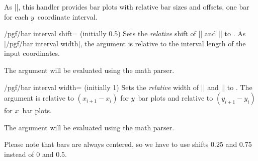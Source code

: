\begin{command}{\pgfplothandlerxbarinterval}
    As |\pgfplothandlerybarinterval|, this handler provides bar plots with
    relative bar sizes and offsets, one bar for each $y$~coordinate interval.
\end{command}

\label{key-bar-interval-shift}%
\begin{key}{/pgf/bar interval shift= (initially 0.5)}
    Sets the \emph{relative} shift of |\pgfplothandlerxbarinterval| and
    |\pgfplothandlerybarinterval| to . As
    |/pgf/bar interval width|, the argument is relative to the interval length
    of the input coordinates.

    The argument  will be evaluated using the math parser.
\end{key}

\label{key-bar-interval-width}%
\begin{key}{/pgf/bar interval width= (initially 1)}
    Sets the \emph{relative} width of |\pgfplothandlerxbarinterval| and
    |\pgfplothandlerybarinterval| to . The argument is relative to
    $(x_{i+1} - x_i)$ for $y$~bar plots and relative to $(y_{i+1}-y_i)$ for
    $x$~bar plots.

    The argument  will be evaluated using the math parser.
\begin{codeexample}[]
\end{codeexample}
    Please note that bars are always centered, so we have to use shifts $0.25$
    and $0.75$ instead of $0$ and $0.5$.
\end{key}


